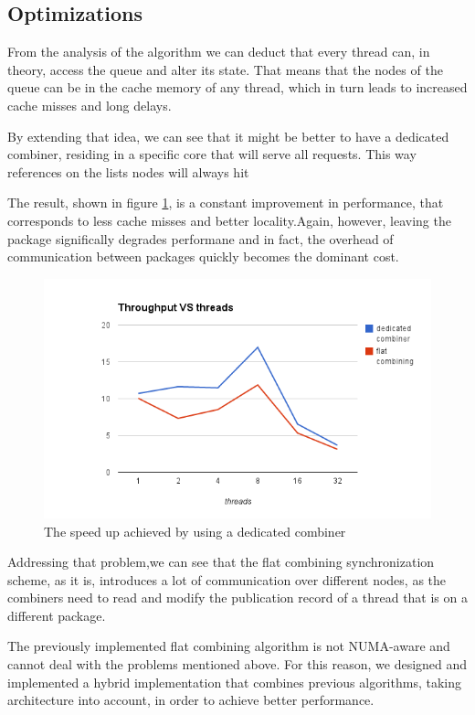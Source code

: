 \subsection{Optimizations}


From the analysis of the algorithm we can deduct that every thread can, in theory, access the queue and alter its state. That means that the nodes of the queue can be in the cache memory of any thread, which in turn leads to increased cache misses and long delays.

By extending that idea, we can see that it might be better to have a dedicated combiner, residing in a specific core that will serve all requests. This way references on the lists nodes will always hit


The result, shown in figure \ref{queue_fc_dedicated_perf}, is a constant improvement in performance, that corresponds  to less cache misses and better locality.Again, however, leaving the package significally degrades performane and in fact, the overhead of communication between packages quickly becomes the dominant cost.

\begin{figure}
 \centering
  \includegraphics[scale=0.7]{queue_fc_dedicated_perf.png}
\caption{The speed up achieved by using a dedicated combiner}
\label{queue_fc_dedicated_perf}
\end{figure}

Addressing that problem,we can see that the flat combining synchronization scheme, as it is, introduces a lot of communication over different nodes, as the combiners need to read and modify the publication record of a thread that is on a different package.


The previously implemented flat combining algorithm is not NUMA-aware and cannot deal with the problems mentioned above. For this reason, we designed and implemented a hybrid implementation that combines previous algorithms, taking architecture into account, in order to achieve better performance.

